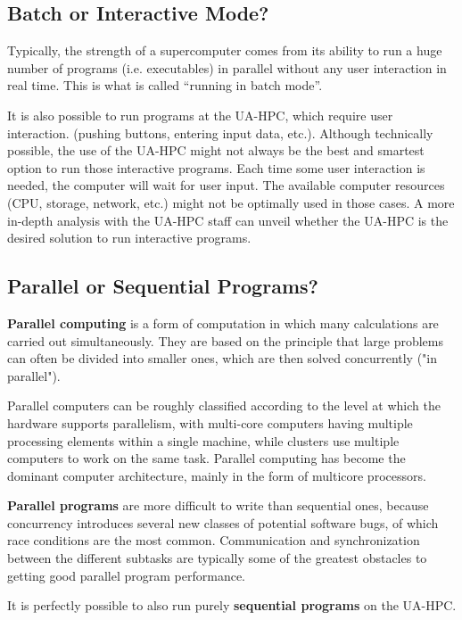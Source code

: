 \subsection{Batch or Interactive Mode?}

Typically, the strength of a supercomputer comes from its ability to run a huge
number of programs (i.e. executables) in parallel without any user interaction
in real time. This is what is called ``running in batch mode''.

It is also possible to run programs at the UA-HPC, which require user
interaction. (pushing buttons, entering input data, etc.).  Although
technically possible, the use of the UA-HPC might not always be the best and
smartest option to run those interactive programs.  Each time some user
interaction is needed, the computer will wait for user input. The available
computer resources (CPU, storage, network, etc.) might not be optimally used in
those cases. A more in-depth analysis with the UA-HPC staff can unveil whether
the UA-HPC is the desired solution to run interactive programs.

\subsection{Parallel or Sequential Programs?}

\textbf{Parallel computing} is a form of computation in which many calculations
are carried out simultaneously. They are based on the principle that large
problems can often be divided into smaller ones, which are then solved
concurrently ("in parallel").

Parallel computers can be roughly classified according to the level at which
the hardware supports parallelism, with multi-core computers having multiple
processing elements within a single machine, while clusters use multiple
computers to work on the same task. Parallel computing has become the dominant
computer architecture, mainly in the form of multicore processors.

\textbf{Parallel programs} are more difficult to write than sequential ones,
because concurrency introduces several new classes of potential software bugs,
of which race conditions are the most common. Communication and synchronization
between the different subtasks are typically some of the greatest obstacles to
getting good parallel program performance.

It is perfectly possible to also run purely \textbf{sequential programs} on the
UA-HPC.

